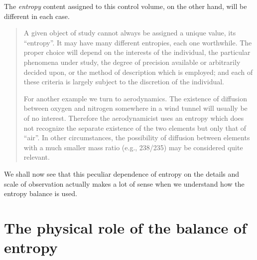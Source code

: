 \documentclass[a4paper,12pt,%
onecolumn,oneside,titlepage,%
british%
]{memoir}
\renewcommand*{\|}[1][]{\nonscript\:#1\vert\nonscript\:\mathopen{}}
\newcommand*{\sect}{\S}%
\begin{document}
The \emph{entropy} content assigned to this control volume, on the other hand, will be different in each case.
\begin{quote}\footnotesize
A given object of study cannot always be assigned a unique value, its ``entropy''. It may have many different entropies, each one worthwhile. The proper choice will depend on the interests of the individual, the particular phenomena under study, the degree of precision available or arbitrarily decided upon, or the method of description which is employed; and each of these criteria is largely subject to the discretion of the individual. \textelp{}


For another example we turn to aerodynamics. The existence of diffusion between oxygen and nitrogen somewhere in a wind tunnel will usually be of no interest. Therefore the aerodynamicist uses an entropy which does not recognize the separate existence of the two elements but only that of ``air''. In other circumstances, the possibility of diffusion between elements with a much smaller mass ratio (e.g., 238/235) may be considered quite relevant.
\sourceatright{\parencites[\sect~1 pp.~323, 325]{grad1961}}
\end{quote}


We shall now see that this peculiar dependence of entropy on the details and scale of observation actually makes a lot of sense when we understand how the entropy balance is used.


\section{The physical role of the balance of entropy}
\label{sec:entropy_balance_role}
\end{document}
